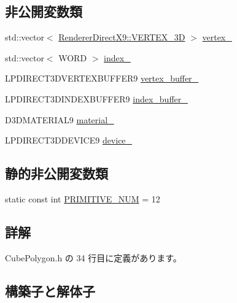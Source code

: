 \subsection*{非公開変数類}
\begin{DoxyCompactItemize}
\item 
std\+::vector$<$ \mbox{\hyperlink{class_renderer_direct_x9_1_1_v_e_r_t_e_x__3_d}{Renderer\+Direct\+X9\+::\+V\+E\+R\+T\+E\+X\+\_\+3D}} $>$ \mbox{\hyperlink{class_cube_polygon_adef890976f8ff8675aeb1c8a5a56ba7b}{vertex\+\_\+}}
\item 
std\+::vector$<$ W\+O\+RD $>$ \mbox{\hyperlink{class_cube_polygon_ac1405f52ed52453068575f2fb8d420a5}{index\+\_\+}}
\item 
L\+P\+D\+I\+R\+E\+C\+T3\+D\+V\+E\+R\+T\+E\+X\+B\+U\+F\+F\+E\+R9 \mbox{\hyperlink{class_cube_polygon_adbb5b6de2c10bfaba0d91569ac81e589}{vertex\+\_\+buffer\+\_\+}}
\item 
L\+P\+D\+I\+R\+E\+C\+T3\+D\+I\+N\+D\+E\+X\+B\+U\+F\+F\+E\+R9 \mbox{\hyperlink{class_cube_polygon_a42d5b3b2ed933782a28db4456ff552d3}{index\+\_\+buffer\+\_\+}}
\item 
D3\+D\+M\+A\+T\+E\+R\+I\+A\+L9 \mbox{\hyperlink{class_cube_polygon_a19348e35d55775f543a191b0a374b853}{material\+\_\+}}
\item 
L\+P\+D\+I\+R\+E\+C\+T3\+D\+D\+E\+V\+I\+C\+E9 \mbox{\hyperlink{class_cube_polygon_a769fe3f6b4695d5bf4823489b76ea805}{device\+\_\+}}
\end{DoxyCompactItemize}
\subsection*{静的非公開変数類}
\begin{DoxyCompactItemize}
\item 
static const int \mbox{\hyperlink{class_cube_polygon_a9d08fbf2d854fdbf0232750573f3aeee}{P\+R\+I\+M\+I\+T\+I\+V\+E\+\_\+\+N\+UM}} = 12
\end{DoxyCompactItemize}


\subsection{詳解}


 Cube\+Polygon.\+h の 34 行目に定義があります。



\subsection{構築子と解体子}
\mbox{\label{class_cube_polygon_aee418cf078227778280dafb22d7586bb}} 
